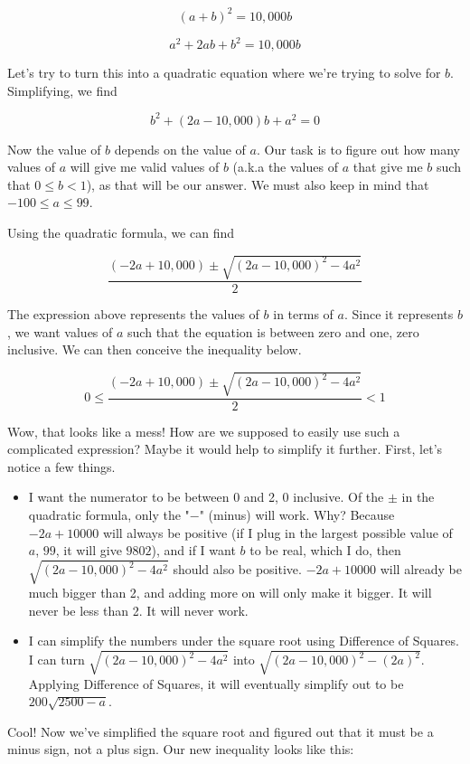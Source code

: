 \begin{enumerate}
 
 \[(a+b)^2 = 10,000b\]

 \[a^2+2ab+b^2 = 10,000b\]

 Let's try to turn this into a quadratic equation where we're trying to solve for $b$. Simplifying, we find

 
 \[b^2+(2a-10,000)b+a^2 = 0\]

 Now the value of $b$ depends on the value of $a$. Our task is to figure out how many values of $a$ will give me valid values of $b$ (a.k.a the values of $a$ that give me $b$ such that $0 \leq b < 1$), as that will be our answer. We must also keep in mind that $-100 \leq a \leq 99$.

 Using the quadratic formula, we can find

 
 \[\frac{(-2a+10,000) \pm \sqrt{(2a-10,000)^2-4a^2}}{2}\]

 The expression above represents the values of $b$ in terms of $a$. Since it represents $b$, we want values of $a$ such that the equation is between zero and one, zero inclusive. We can then conceive the inequality below.

 
 \[0 \leq \frac{(-2a+10,000) \pm \sqrt{(2a-10,000)^2-4a^2}}{2} < 1\]

 Wow, that looks like a mess! How are we supposed to easily use such a complicated expression? Maybe it would help to simplify it further. First, let's notice a few things.

 
            \begin{itemize}
        \item I want the numerator to be between 0 and 2, 0 inclusive. Of the $\pm$ in the quadratic formula, only the "$-$" (minus) will work. Why? Because $-2a+10000$ will always be positive (if I plug in the largest possible value of $a$, $99$, it will give $9802$), and if I want $b$ to be real, which I do, then $\sqrt{(2a-10,000)^2-4a^2}$ should also be positive. $-2a+10000$ will already be much bigger than 2, and adding more on will only make it bigger. It will never be less than 2. It will never work.
            \end{itemize}
            
            \begin{itemize}
        \item I can simplify the numbers under the square root using Difference of Squares. I can turn $\sqrt{(2a-10,000)^2-4a^2}$ into $\sqrt{(2a-10,000)^2-(2a)^2}$. Applying Difference of Squares, it will eventually simplify out to be $200\sqrt{2500-a}$.
            \end{itemize}
            Cool! Now we've simplified the square root and figured out that it must be a minus sign, not a plus sign. Our new inequality looks like this:


\end{enumerate}
